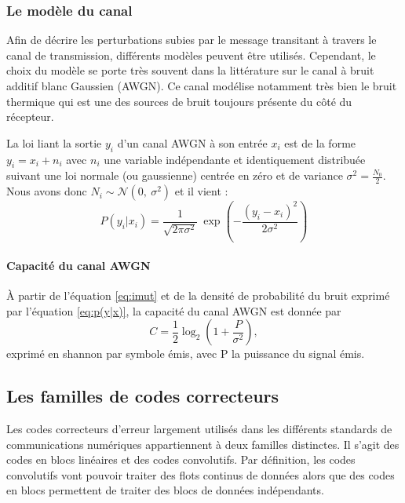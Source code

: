 \subsubsection{Le modèle du canal}\label{ss:cod_canal}
Afin de décrire les perturbations subies par le message transitant à travers le canal de transmission, différents modèles 
peuvent être utilisés. 
Cependant, le choix du modèle se porte très souvent dans la littérature sur le canal à bruit additif blanc Gaussien 
(AWGN). 
Ce canal modélise notamment très bien le bruit thermique qui est une des sources de bruit toujours présente du côté du récepteur.

La loi liant la sortie $y_i$ d'un canal AWGN à son entrée $x_i$ est de la forme $y_i=x_i+n_i$ avec $n_i$ une variable 
indépendante et identiquement distribuée suivant une loi normale (ou gaussienne) centrée en zéro et de variance $\sigma^2 = \frac{N_0}{2}$. Nous avons donc
$N_i \sim \mathcal{N}(0,\ \sigma^2)$ et il vient :
\begin{equation}
	\label{eq:p(y|x)}
	P(y_i|x_i) = \frac{1}{\sqrt{2\pi \sigma^2}}~\exp\left(-{\frac{(y_i-x_i)^2}{2\sigma^2}}\right)
\end{equation}

\paragraph*{Capacité du canal AWGN}
À partir de l'équation \ref{eq:imut} et de la densité de probabilité du bruit exprimé par l'équation \ref{eq:p(y|x)}, la 
capacité du canal AWGN est donnée par \begin{equation}\label{eq:capacity}
C = \frac{1}{2} \log_2\left(1 + \frac{P}{\sigma^2}\right),
\end{equation}
exprimé en shannon par symbole émis, avec P la puissance du signal émis.

\subsection{Les familles de codes correcteurs}
Les codes correcteurs d'erreur largement utilisés dans les différents standards de communications numériques 
appartiennent à deux familles distinctes. Il s'agit des codes en blocs linéaires et des codes convolutifs. Par définition, 
les codes convolutifs vont pouvoir traiter des flots continus de données alors que des codes en blocs permettent 
de traiter des blocs de données indépendants.

